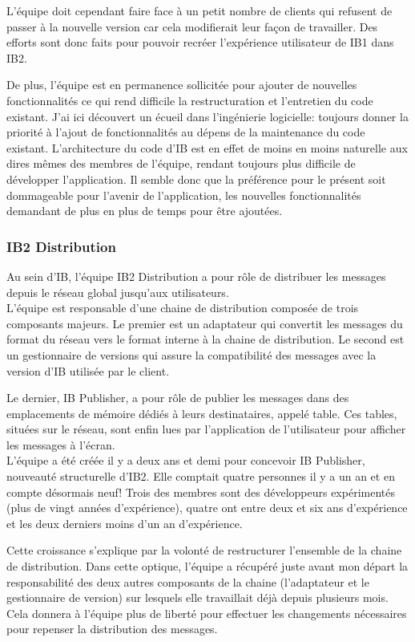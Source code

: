 \documentclass[11pt, oneside, titlepage, a4paper]{article}
\begin{document}
L'équipe doit cependant faire face à un petit nombre de clients qui refusent de passer à la nouvelle version car cela modifierait leur façon de travailler. Des efforts sont donc faits pour pouvoir recréer l'expérience utilisateur de IB1 dans IB2.

De plus, l'équipe est en permanence sollicitée pour ajouter de nouvelles fonctionnalités ce qui rend difficile la restructuration et l'entretien du code existant. J'ai ici découvert un écueil dans l'ingénierie logicielle: toujours donner la priorité à l'ajout de fonctionnalités au dépens de la maintenance du code existant. L'architecture du code d'IB est en effet de moins en moins naturelle aux dires mêmes des membres de l'équipe, rendant toujours plus difficile de développer l'application. Il semble donc que la préférence pour le présent soit dommageable pour l'avenir de l'application, les nouvelles fonctionnalités demandant de plus en plus de temps pour être ajoutées.
		\subsubsection{IB2 Distribution}
Au sein d'IB, l'équipe IB2 Distribution a pour rôle de distribuer les messages depuis le réseau global jusqu'aux utilisateurs. 
\\

L'équipe est responsable d'une chaine de distribution composée de trois composants majeurs. Le premier est un adaptateur qui convertit les messages du format du réseau vers le format interne à la chaine de distribution. Le second est un gestionnaire de versions qui assure la compatibilité des messages avec la version d'IB utilisée par le client.

Le dernier, IB Publisher, a pour rôle de publier les messages dans des emplacements de mémoire dédiés à leurs destinataires, appelé table. Ces tables, situées sur le réseau, sont enfin lues par l'application de l'utilisateur pour afficher les messages à l'écran.
\\

L'équipe a été créée il y a deux ans et demi pour concevoir IB Publisher, nouveauté structurelle d'IB2. Elle comptait quatre personnes il y a un an et en compte désormais neuf! Trois des membres sont des développeurs expérimentés (plus de vingt années d'expérience), quatre ont entre deux et six ans d'expérience et les deux derniers moins d'un an d'expérience.

Cette croissance s'explique par la volonté de restructurer l'ensemble de la chaine de distribution. Dans cette optique, l'équipe a récupéré juste avant mon départ la responsabilité des deux autres composants de la chaine (l'adaptateur et le gestionnaire de version) sur lesquels elle travaillait déjà depuis plusieurs mois. Cela donnera à l'équipe plus de liberté pour effectuer les changements nécessaires pour repenser la distribution des messages.
\end{document}
